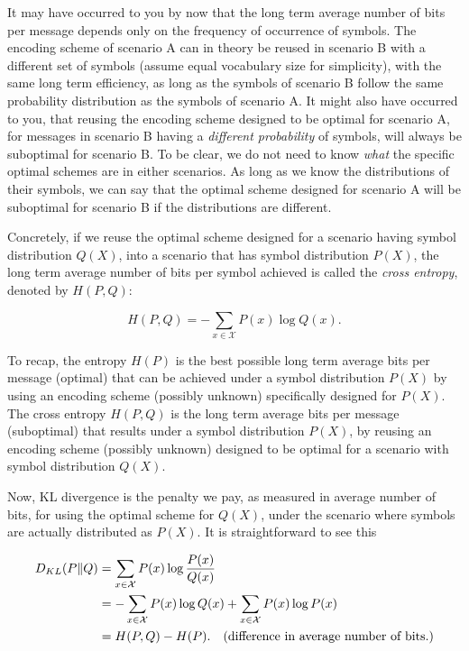 It may have occurred to you by now that the long term average number of bits per message depends only
on the frequency of occurrence of symbols. The encoding scheme of scenario A can in theory be
reused in scenario B with a different set of symbols (assume equal vocabulary size for simplicity),
with the same long term efficiency, as long as the symbols of scenario B follow the same probability
distribution as the symbols of scenario A. It might also have occurred to you, that reusing the encoding scheme
designed to be optimal for scenario A, for messages in scenario B having a \emph{different probability} of symbols, will always
be suboptimal for scenario B. To be clear, we do not need to know \emph{what} the specific optimal
schemes are in either scenarios. As long as we know the distributions of their symbols,
we can say that the optimal scheme designed for scenario A will be suboptimal for scenario B if the
distributions are different.

Concretely, if we reuse the optimal scheme designed for a scenario having symbol distribution $Q(X)$,
into a scenario that has symbol distribution $P(X)$, the long term average
number of bits per symbol achieved is called the \emph{cross entropy}, denoted by $H(P, Q)$:

$$H(P, Q) = -\sum_{x \in \mathcal{X}} P(x) \log Q(x). $$

To recap, the entropy $H(P)$ is the best possible long term average bits per message (optimal) that
can be achieved under a symbol distribution $P(X)$ by using an encoding scheme (possibly unknown)
specifically designed for $P(X)$. The cross entropy $H(P, Q)$ is the long term average bits per
message (suboptimal) that results under a symbol distribution $P(X)$, by reusing an encoding
scheme (possibly unknown) designed to be optimal for a scenario with symbol distribution $Q(X)$.

Now, KL divergence is the penalty we pay, as measured in average number of bits, for using the
optimal scheme for $Q(X)$, under the scenario where symbols are actually distributed as $P(X)$. It is
straightforward to see this

\begin{align*}
D_{KL}(P \| Q) &= \sum_{x \in \mathcal{X}} P(x) \log\frac{P(x)}{Q(x)} \\
&=  - \sum_{x\in \mathcal{X}}P(x) \log Q(x) + \sum_{x \in \mathcal{X}} P(x) \log P(x) \\
&= H(P, Q) - H(P). \quad \text{(difference in average number of bits.)}
\end{align*}


